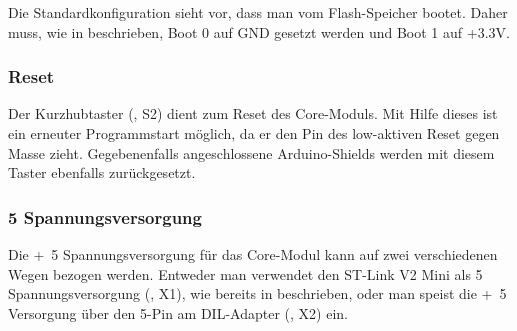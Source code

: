 Die Standardkonfiguration sieht vor, dass man vom Flash-Speicher bootet. Daher muss, wie in  beschrieben, Boot 0 auf GND gesetzt werden und Boot 1 auf +3.3V.


\subsubsection{Reset}
Der Kurzhubtaster (, S2) dient zum Reset des \gls{Core-Modul}s. Mit Hilfe dieses ist ein erneuter Programmstart möglich, da er den Pin des low-aktiven Reset gegen Masse zieht. Gegebenenfalls angeschlossene Arduino-Shields werden mit diesem Taster ebenfalls zurückgesetzt.


\subsubsection{\unit{5}{\volt} Spannungsversorgung}
Die \unit{+5}{\volt} Spannungsversorgung für das \gls{Core-Modul} kann auf zwei verschiedenen Wegen bezogen werden. Entweder man verwendet den ST-Link V2 Mini als \unit{5}{\volt} Spannungsversorgung (, X1), wie bereits in  beschrieben, oder man speist die \unit{+5}{\volt} Versorgung über den \unit{5}{\volt}-Pin am DIL-Adapter (, X2) ein.


